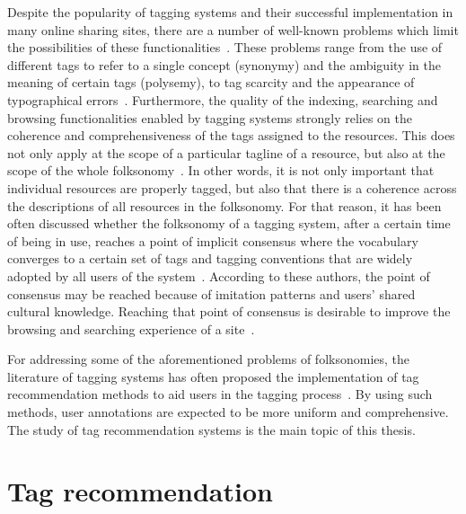 Despite the popularity of tagging systems and their successful implementation in many online sharing sites, there are a number of well-known problems which limit the possibilities of these functionalities~\citep{Guy2006}.
These problems range from the use of different tags to refer to a single concept (synonymy) and the ambiguity in the meaning of certain tags (polysemy), to tag scarcity and the appearance of typographical errors~\citep{golder2006,halpin2006}. 
Furthermore, the quality of the indexing, searching and browsing functionalities enabled by tagging systems strongly relies on the coherence and comprehensiveness of the tags assigned to the resources.
This does not only apply at the scope of a particular tagline of a resource, but also at the scope of the whole folksonomy~\citep{Spiteri2006}.
In other words, it is not only important that individual resources are properly tagged, but also that there is a coherence across the descriptions of all resources in the folksonomy.
For that reason, it has been often discussed whether the folksonomy of a tagging system, after a certain time of being in use, reaches a point of implicit consensus where the vocabulary converges to a certain set of tags and tagging conventions that are widely adopted by all users of the system~\citep{halpin2006,Sen,Sood2007,Robu2009,Wagner2014}.
According to these authors, the point of consensus may be reached because of imitation patterns and users' shared cultural knowledge.
Reaching that point of consensus is desirable to improve the browsing and searching experience of a site~\citep{Guy2006}.

For addressing some of the aforementioned problems of folksonomies, the literature of tagging systems has often proposed the implementation of tag recommendation methods to aid users in the tagging process~\citep{golder2006,halpin2006,marlow2006}. 
By using such methods, user annotations are expected to be more uniform and comprehensive.
The study of tag recommendation systems is the main topic of this thesis.



\section{Tag recommendation}

